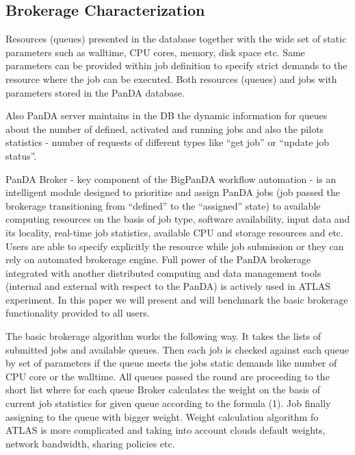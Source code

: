 \subsection{Brokerage Characterization}
\label{subsec:brokerage}

Resources (queues) presented in the database together with the wide set of
static parameters such as walltime, CPU cores, memory, disk space etc. Same
parameters can be provided within job definition to specify strict demands to
the resource where the job can be executed. Both resources (queues) and jobs
with parameters stored in the PanDA database.

Also PanDA server maintains in the DB the dynamic information for queues about
the number of defined, activated and running jobs and also the pilots
statistics - number of requests of different types like ``get job'' or ``update
job status''.

PanDA Broker - key  component of the BigPanDA workflow automation - is an
intelligent module designed to prioritize and assign PanDA jobs (job passed the
brokerage transitioning from ``defined'' to the ``assigned'' state) to
available computing resources on the basis of job type, software availability,
input data and its locality, real-time job statistics, available CPU and
storage resources and etc. Users are able to specify explicitly the resource
while job submission or they can rely on automated brokerage engine. Full power
of the PanDA brokerage integrated with another distributed computing and data
management tools (internal and external with respect to the PanDA) is actively
used in ATLAS experiment. In this paper we will present and will benchmark the
basic brokerage functionality provided to all users.

The basic brokerage algorithm works the following way. It takes the lists of
submitted jobs and available queues. Then each job is checked against each
queue by set of parameters if the queue meets the jobs static demands like
number of CPU core or the walltime. All queues passed the round are proceeding
to the short list where for each queue Broker calculates the weight on the
basis of current job statistics for given queue according to the formula (1).
Job finally assigning to the queue with bigger weight. Weight calculation
algorithm fo ATLAS is more complicated and taking into account clouds default
weights, network bandwidth, sharing policies etc.




